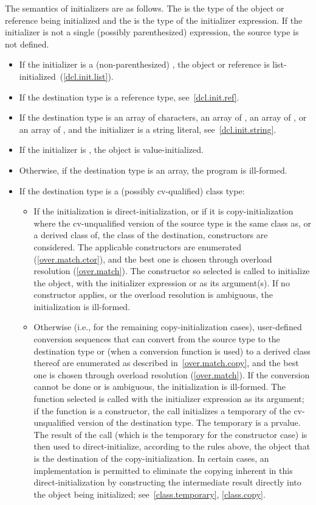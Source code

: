 \pnum
The semantics of initializers are as follows.
The
%
is the type of the object or reference being initialized and the
is the type of the initializer expression.
If the initializer is not a single (possibly parenthesized) expression, the
source type is not defined.

\begin{itemize}
\item
If the initializer is a (non-parenthesized) , the object or reference
is list-initialized~(\ref{dcl.init.list}).
\item
If the destination type is a reference type, see~\ref{dcl.init.ref}.
\item
If the destination type is an array of characters,
an array of ,
an array of ,
or an array of
,
and the initializer is a string literal, see~\ref{dcl.init.string}.
\item If the initializer is \tcode{()}, the object is value-initialized.
\item
Otherwise, if the destination type is an array, the program is ill-formed.
\item
If the destination type is a (possibly cv-qualified) class type:

\begin{itemize}
\item
If the initialization is direct-initialization,
or if it is copy-initialization where the cv-unqualified version of the source
type is the same class as, or a derived class of, the class of the destination,
constructors are considered.
The applicable constructors
are enumerated (\ref{over.match.ctor}), and the best one is chosen
through overload resolution (\ref{over.match}).
The constructor so selected
is called to initialize the object, with the initializer
expression or  as its argument(s).
If no constructor applies, or the overload resolution is
ambiguous, the initialization is ill-formed.
\item
Otherwise (i.e., for the remaining copy-initialization cases),
user-defined conversion sequences that can convert from the
source type to the destination type or (when a conversion function
is used) to a derived class thereof are enumerated as described in~\ref{over.match.copy}, and the best one is chosen through overload
resolution (\ref{over.match}).  If the conversion cannot be done or
is ambiguous, the initialization is ill-formed.  The function
selected is called with the initializer expression as its
argument; if the function is a constructor, the call initializes
a temporary of the cv-unqualified version of the
destination type.  The temporary is a prvalue. The result of the call
(which is the temporary for the constructor case) is then used
to direct-initialize, according to the rules above, the object
that is the destination of the copy-initialization.  In certain
cases, an implementation is permitted to eliminate the copying
inherent in this direct-initialization by constructing the
intermediate result directly into the object being initialized;
see~\ref{class.temporary}, \ref{class.copy}.
\end{itemize}


\end{itemize}
